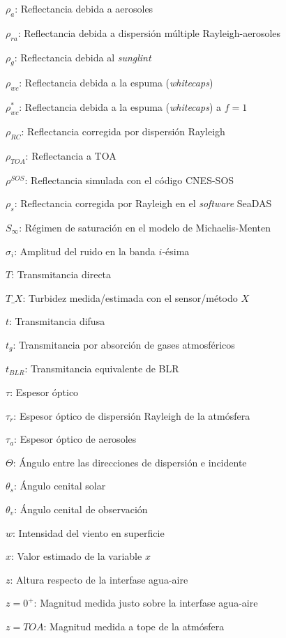 {$\rho_{a}$: Reflectancia debida a aerosoles

$\rho_{ra}$: Reflectancia debida a dispersión múltiple Rayleigh-aerosoles

$\rho_{g}$: Reflectancia debida al \textit{sunglint}

$\rho_{wc}$: Reflectancia debida a la espuma (\textit{whitecaps})

$\rho^{*}_{wc}$: Reflectancia debida a la espuma (\textit{whitecaps}) a $f=1$

$\rho_{RC}$: Reflectancia corregida por dispersión Rayleigh

$\rho_{TOA}$: Reflectancia a TOA

$\rho^{SOS}$: Reflectancia simulada con el código CNES-SOS

$\rho_{s}$: Reflectancia corregida por Rayleigh en el \textit{software} SeaDAS

$S_{\infty}$: Régimen de saturación en el modelo de Michaelis-Menten

$\sigma_{i}$: Amplitud del ruido en la banda $i$-ésima

$T$: Transmitancia directa

$T\_{X}$: Turbidez medida/estimada con el sensor/método $X$

$t$: Transmitancia difusa

$t_{g}$: Transmitancia por absorción de gases atmosféricos

$t_{BLR}$: Transmitancia equivalente de BLR

$\tau$: Espesor óptico

$\tau_{r}$: Espesor óptico de dispersión Rayleigh de la atmósfera

$\tau_{a}$: Espesor óptico de aerosoles

$\Theta$: Ángulo entre las direcciones de dispersión e incidente

$\theta_{s}$: Ángulo cenital solar

$\theta_{v}$: Ángulo cenital de observación

$w$: Intensidad del viento en superficie

$\hat{x}$: Valor estimado de la variable $x$

$z$: Altura respecto de la interfase agua-aire

$z = 0^{+}$: Magnitud medida justo sobre la interfase agua-aire

$z = TOA$: Magnitud medida a tope de la atmósfera

}

